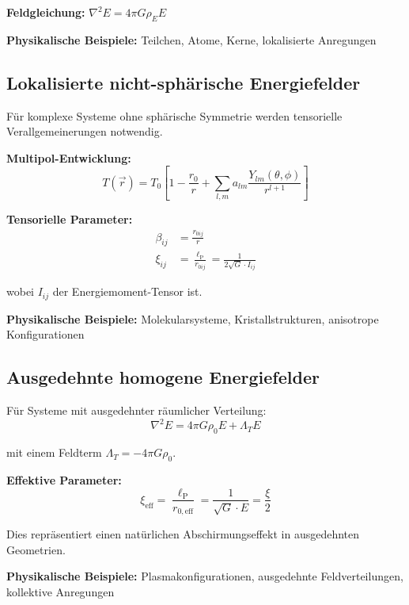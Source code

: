 \documentclass[12pt,a4paper]{report}
\newcommand{\lP}{\ell_{\text{P}}}         %
\newcommand{\Lambdat}{\Lambda_T}          %
\newcommand{\rzero}{r_0}                  %
\begin{document}
	\textbf{Feldgleichung:} $\nabla^2 E = 4\pi G \rho_E E$
	
	\textbf{Physikalische Beispiele:} Teilchen, Atome, Kerne, lokalisierte Anregungen
	
	\subsection{Lokalisierte nicht-sphärische Energiefelder}
	\label{subsec:localized_nonsphere}
	
	Für komplexe Systeme ohne sphärische Symmetrie werden tensorielle Verallgemeinerungen notwendig.
	
	\textbf{Multipol-Entwicklung:}
	\begin{equation}
		T(\vec{r}) = T_0\left[1 - \frac{\rzero}{r} + \sum_{l,m} a_{lm} \frac{Y_{lm}(\theta,\phi)}{r^{l+1}}\right]
		\label{eq:multipole_expansion}
	\end{equation}
	
	\textbf{Tensorielle Parameter:}
	\begin{align}
		\beta_{ij} &= \frac{r_{0ij}}{r} \\
		\xi_{ij} &= \frac{\lP}{r_{0ij}} = \frac{1}{2\sqrt{G} \cdot I_{ij}}
	\end{align}
	
	wobei $I_{ij}$ der Energiemoment-Tensor ist.
	
	\textbf{Physikalische Beispiele:} Molekularsysteme, Kristallstrukturen, anisotrope Konfigurationen
	
	\subsection{Ausgedehnte homogene Energiefelder}
	\label{subsec:extended_homogeneous}
	
	Für Systeme mit ausgedehnter räumlicher Verteilung:
	\begin{equation}
		\nabla^2 E = 4\pi G \rho_0 E + \Lambdat E
	\end{equation}
	
	mit einem Feldterm $\Lambdat = -4\pi G \rho_0$.
	
	\textbf{Effektive Parameter:}
	\begin{equation}
		\xi_{\text{eff}} = \frac{\lP}{r_{0,\text{eff}}} = \frac{1}{\sqrt{G} \cdot E} = \frac{\xi}{2}
	\end{equation}
	
	Dies repräsentiert einen natürlichen Abschirmungseffekt in ausgedehnten Geometrien.
	
	\textbf{Physikalische Beispiele:} Plasmakonfigurationen, ausgedehnte Feldverteilungen, kollektive Anregungen
	
\end{document}
